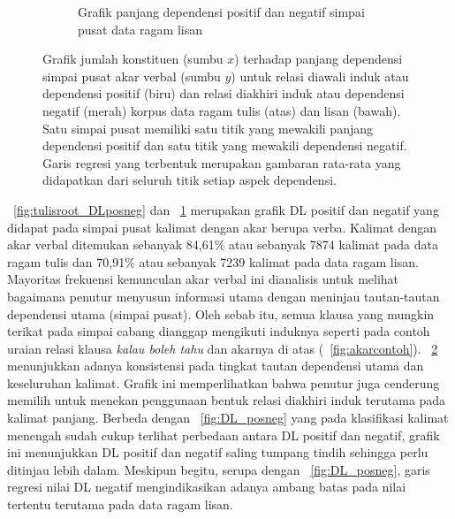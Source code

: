 \begin{figure}
\begin{subfigure}{.7\linewidth}
	\caption{Grafik panjang dependensi positif dan negatif simpai pusat data ragam lisan}
	\label{fig:lisanroot_DLposneg} 
\end{subfigure}

\caption{Grafik jumlah konstituen (sumbu $x$) terhadap panjang dependensi simpai pusat akar verbal (sumbu $y$) untuk relasi diawali induk atau dependensi positif (biru) dan relasi diakhiri induk atau dependensi negatif (merah) korpus data ragam tulis (atas) dan lisan (bawah). Satu simpai pusat memiliki satu titik yang mewakili panjang dependensi positif dan satu titik yang mewakili dependensi negatif. Garis regresi yang terbentuk merupakan gambaran rata-rata yang didapatkan dari seluruh titik setiap aspek dependensi.}
\label{fig:rootDL_posneg}
\end{figure}

\pic~\ref{fig:tulisroot_DLposneg} dan \pic~\ref{fig:lisanroot_DLposneg} merupakan grafik DL positif dan negatif yang didapat pada simpai pusat kalimat dengan akar berupa verba. Kalimat dengan akar verbal ditemukan sebanyak 84,61\% atau sebanyak 7874 kalimat pada data ragam tulis dan 70,91\% atau sebanyak 7239 kalimat pada data ragam lisan. Mayoritas frekuensi kemunculan akar verbal ini dianalisis untuk melihat bagaimana penutur menyusun informasi utama dengan meninjau tautan-tautan dependensi utama (simpai pusat). Oleh sebab itu, semua klausa yang mungkin terikat pada simpai cabang dianggap mengikuti induknya seperti pada contoh uraian relasi klausa \textit{kalau boleh tahu} dan akarnya di atas (\pic~\ref{fig:akarcontoh}). \pic~\ref{fig:rootDL_posneg} menunjukkan adanya konsistensi pada tingkat tautan dependensi utama dan keseluruhan kalimat. Grafik ini memperlihatkan bahwa penutur juga cenderung memilih untuk menekan penggunaan bentuk relasi diakhiri induk terutama pada kalimat panjang. Berbeda dengan \pic~\ref{fig:DL_posneg} yang pada klasifikasi kalimat menengah sudah cukup terlihat perbedaan antara DL positif dan negatif, grafik ini menunjukkan DL positif dan negatif saling tumpang tindih sehingga perlu ditinjau lebih dalam. Meskipun begitu, serupa dengan \pic~\ref{fig:DL_posneg}, garis regresi nilai DL negatif mengindikasikan adanya ambang batas pada nilai tertentu terutama pada data ragam lisan.

